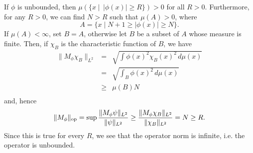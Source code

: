 \documentclass[12pt]{article}
\begin{document}
If $\phi$ is unbounded, then $\mu (\{ x \mid\,|\phi (x)| \ge R\}) > 0$
for all $R>0$.  Furthermore, for any $R>0$, we can find $N>R$ such
that $\mu(A) > 0$, where
\[A = \{ x \mid N+1 \ge |\phi (x)| \ge N\}.\]
 If $\mu(A) < \infty$, set $B= A$, otherwise let
$B$ be a subset of $A$ whose measure is finite.  Then, if $\chi_B$ is
the characteristic function of $B$, we have
\begin{eqnarray*}
\| M_\phi \chi_B \|_{L^2} &=&  \sqrt{\int \phi(x)^2 \chi_B(x)^2
\,d\mu(x)} \\
&=& \sqrt{\int_B \phi(x)^2 \,d\mu(x)} \\
&\ge& \mu(B) N\\
\end{eqnarray*}
and, hence
\[ \| M_\phi \|_\mathrm{op} = \sup {\| M_\phi \psi \|_{L^2} \over \|
\psi \|_{L^2}} \ge {\| M_\phi \chi_B \|_{L^2} \over \| \chi_B
\|_{L^2}} = N \ge R.\]
Since this is true for every $R$, we see that the operator norm is
infinite, i.e. the operator is unbounded.
\end{document}

